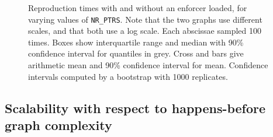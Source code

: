 \begin{figure}
  \caption{Reproduction times with and without an enforcer loaded, for
    varying values of \texttt{NR\_PTRS}.  Note that the two graphs use
    different scales, and that both use a log scale.  Each abscissae
    sampled 100 times.  Boxes show interquartile range and median with
    90\% confidence interval for quantiles in grey.  Cross and bars
    give arithmetic mean and 90\% confidence interval for mean.
    Confidence intervals computed by a bootstrap with 1000
    replicates.}
  \label{fig:eval:indexed_toctou:nr_ptrs}
\end{figure}

\subsection{Scalability with respect to happens-before graph complexity}

